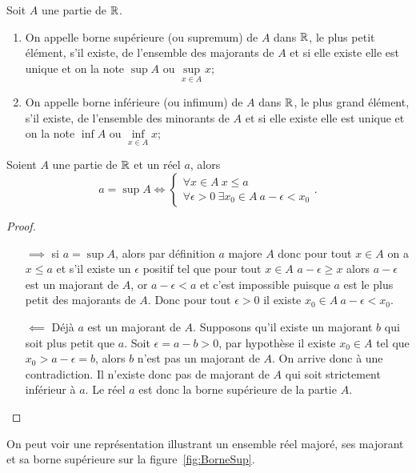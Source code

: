Soit \(A\) une partie de \(\mathbb{R}\).
\begin{defdef}
  \begin{enumerate}
  \item On appelle borne supérieure (ou supremum) de \(A\) dans \(\mathbb{R}\), le plus petit élément, s'il existe, de l'ensemble des majorants de \(A\) et si elle existe elle est unique et on la note \(\sup A\) ou \(\sup\limits_{x\in A} x\);
\item On appelle borne inférieure (ou infimum) de \(A\) dans \(\mathbb{R}\), le plus grand élément, s'il existe, de l'ensemble des minorants de \(A\) et si elle existe elle est unique et on la note \(\inf A\) ou \(\inf\limits_{x\in A} x\);
  \end{enumerate}
\end{defdef}
\begin{theo}
  Soient \(A\) une partie de \(\mathbb{R}\) et un réel \(a\), alors
  \begin{equation}
    a=\sup A \iff \begin{cases} \forall x \in A \ x\leqslant a \\  \forall \epsilon >0 \ \exists x_0\in A \ a-\epsilon<x_0\end{cases}.
  \end{equation}
\end{theo}
\begin{proof}
  \begin{itemize}
  \item[\(\implies\)] si \(a=\sup A\), alors par définition \(a\) majore \(A\) donc pour tout \(x \in A\) on a \(x\leqslant a\) et s'il existe un \(\epsilon\) positif tel que pour tout \(x\in A\) \(a-\epsilon\geqslant x\) alors \(a-\epsilon\) est un majorant de \(A\), or \(a-\epsilon<a\) et c'est impossible puisque \(a\) est le plus petit des majorants de \(A\). Donc pour tout \(\epsilon >0\) il existe \(x_0\in A \ a-\epsilon<x_0\).
  \item [\(\impliedby\)] Déjà \(a\) est un majorant de \(A\). Supposons qu'il existe un majorant \(b\) qui soit plus petit que \(a\). Soit \(\epsilon=a-b>0\), par hypothèse il existe \(x_0\in A\) tel que \(x_0>a-\epsilon=b\), alors \(b\) n'est pas un majorant de \(A\). On arrive donc à une contradiction. Il n'existe donc pas de majorant de \(A\) qui soit strictement inférieur à \(a\). Le réel \(a\) est donc la borne supérieure de la partie \(A\).
  \end{itemize}
\end{proof}
On peut voir une représentation illustrant un ensemble réel majoré, ses majorant et sa borne supérieure sur la figure~\ref{fig:BorneSup}.
